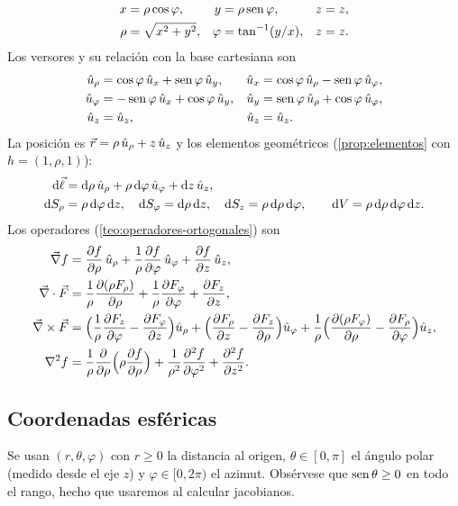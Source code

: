 

\begin{align}
  x&=\rho\cos\varphi, & y&=\rho\operatorname{sen}\varphi, & z&=z,\nonumber\\
  \rho&=\sqrt{x^{2}+y^{2}}, & \varphi&=\tan^{-1}(y/x), & z&=z .\nonumber
\end{align}
Los versores y su relación con la base cartesiana son
\begin{align}
  \hat{u}_{\rho}&=\cos\varphi\,\hat{u}_{x}+\operatorname{sen}\varphi\,\hat{u}_{y}, & \hat{u}_{x}&=\cos\varphi\,\hat{u}_{\rho}-\operatorname{sen}\varphi\,\hat{u}_{\varphi},\nonumber\\
  \hat{u}_{\varphi}&=-\operatorname{sen}\varphi\,\hat{u}_{x}+\cos\varphi\,\hat{u}_{y}, & \hat{u}_{y}&=\operatorname{sen}\varphi\,\hat{u}_{\rho}+\cos\varphi\,\hat{u}_{\varphi},\label{eq:base-cil}\\
  \hat{u}_{z}&=\hat{u}_{z}, & \hat{u}_{z}&=\hat{u}_{z}.\nonumber
\end{align}
La posición es $\vec{r}=\rho\,\hat{u}_{\rho}+z\,\hat{u}_{z}$ y los elementos geométricos
(\cref{prop:elementos} con $h=(1,\rho,1)$):
\begin{align}
  \mathrm{d}\vec{\ell}&=\mathrm{d}\rho\,\hat{u}_{\rho}+\rho\,\mathrm{d}\varphi\,\hat{u}_{\varphi}+\mathrm{d} z\,\hat{u}_{z}, \nonumber\\
  \mathrm{d} S_\rho&=\rho\,\mathrm{d}\varphi\,\mathrm{d} z,\quad
  \mathrm{d} S_\varphi=\mathrm{d}\rho\,\mathrm{d} z,\quad
  \mathrm{d} S_z=\rho\,\mathrm{d}\rho\,\mathrm{d}\varphi,\qquad
  \mathrm{d} V=\rho\,\mathrm{d}\rho\,\mathrm{d}\varphi\,\mathrm{d} z .\nonumber
\end{align}
Los operadores (\cref{teo:operadores-ortogonales}) son
\begin{align}
  \vec{\nabla} f&=\frac{\partial f}{\partial \rho}\,\hat{u}_{\rho}+\frac{1}{\rho}\frac{\partial f}{\partial \varphi}\,\hat{u}_{\varphi}+\frac{\partial f}{\partial z}\,\hat{u}_{z},\nonumber\\
  \vec{\nabla}\cdot\vec{F}&=\frac{1}{\rho}\frac{\partial (\rho F_\rho)}{\partial \rho}+\frac{1}{\rho}\frac{\partial F_\varphi}{\partial \varphi}+\frac{\partial F_z}{\partial z},\nonumber\\
  \vec{\nabla}\times\vec{F}&=\Bigl(\frac{1}{\rho}\frac{\partial F_z}{\partial \varphi}-\frac{\partial F_\varphi}{\partial z}\Bigr)\hat{u}_{\rho}
    +\Bigl(\frac{\partial F_\rho}{\partial z}-\frac{\partial F_z}{\partial \rho}\Bigr)\hat{u}_{\varphi}
    +\frac{1}{\rho}\Bigl(\frac{\partial (\rho F_\varphi)}{\partial \rho}-\frac{\partial F_\rho}{\partial \varphi}\Bigr)\hat{u}_{z},\label{eq:ops-cil}\\
  \nabla^{2} f&=\frac{1}{\rho}\frac{\partial }{\partial \rho}\Bigl(\rho\frac{\partial f}{\partial \rho}\Bigr)+\frac{1}{\rho^{2}}\frac{\partial^{2} f}{\partial \varphi^{2}}+\frac{\partial^{2} f}{\partial z^{2}}.\nonumber
\end{align}

\subsection{Coordenadas esféricas}\label{sec:esfericas}
Se usan $(r,\theta,\varphi)$ con $r\ge0$ la distancia al origen,
$\theta\in[0,\pi]$ el ángulo polar (medido desde el eje $z$) y
$\varphi\in[0,2\pi)$ el azimut. Obsérvese que $\operatorname{sen}\theta\ge0$ en todo el
rango, hecho que usaremos al calcular jacobianos.

